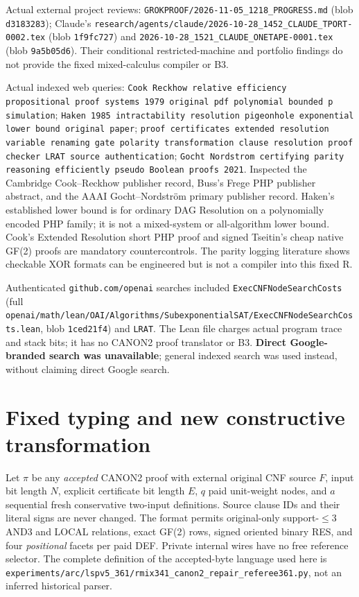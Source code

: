 \documentclass[11pt]{article}
\begin{document}
Actual external project reviews: \texttt{GROKPROOF/2026-11-05\_1218\_PROGRESS.md}
(blob \texttt{d3183283}); Claude's
\texttt{research/agents/claude/2026-10-28\_1452\_CLAUDE\_TPORT-0002.tex}
(blob \texttt{1f9fc727}) and
\texttt{2026-10-28\_1521\_CLAUDE\_ONETAPE-0001.tex}
(blob \texttt{9a5b05d6}). Their conditional restricted-machine and
portfolio findings do not provide the fixed mixed-calculus compiler or B3.

Actual indexed web queries: \texttt{Cook Reckhow relative efficiency propositional proof systems 1979 original pdf polynomial bounded p simulation};
\texttt{Haken 1985 intractability resolution pigeonhole exponential lower bound original paper};
\texttt{proof certificates extended resolution variable renaming gate polarity transformation clause resolution proof checker LRAT source authentication};
\texttt{Gocht Nordstrom certifying parity reasoning efficiently pseudo Boolean proofs 2021}.
Inspected the Cambridge Cook--Reckhow publisher record, Buss's Frege PHP publisher
abstract, and the AAAI Gocht--Nordstr\"om primary publisher record.
Haken's established lower bound is for ordinary DAG Resolution on a polynomially
encoded PHP family; it is not a mixed-system or all-algorithm lower bound.
Cook's Extended Resolution short PHP proof and signed Tseitin's cheap native GF(2)
proofs are mandatory countercontrols. The parity logging literature shows
checkable XOR formats can be engineered but is not a compiler into this fixed R.

Authenticated \texttt{github.com/openai} searches included
\texttt{ExecCNFNodeSearchCosts} (full
\texttt{openai/math/lean/OAI/Algorithms/SubexponentialSAT/ExecCNFNodeSearchCosts.lean},
blob \texttt{1ced21f4}) and \texttt{LRAT}. The Lean file charges actual
program trace and stack bits; it has no CANON2 proof translator or B3.
\textbf{Direct Google-branded search was unavailable}; general indexed search
was used instead, without claiming direct Google search.

\section*{Fixed typing and new constructive transformation}
Let \(\pi\) be any \emph{accepted} CANON2 proof with external original
CNF source \(F\), input bit length \(N\), explicit certificate bit length \(E\),
\(q\) paid unit-weight nodes, and \(a\) sequential fresh conservative
two-input definitions. Source clause IDs and their literal signs are never
changed. The format permits original-only support-\(\le3\) AND3 and LOCAL
relations, exact GF(2) rows, signed oriented binary RES, and four
\emph{positional} facets per paid DEF. Private internal wires have no free
reference selector. The complete definition of the accepted-byte language
used here is \texttt{experiments/arc/lspv5\_361/rmix341\_canon2\_repair\_referee361.py},
not an inferred historical parser.
\end{document}
